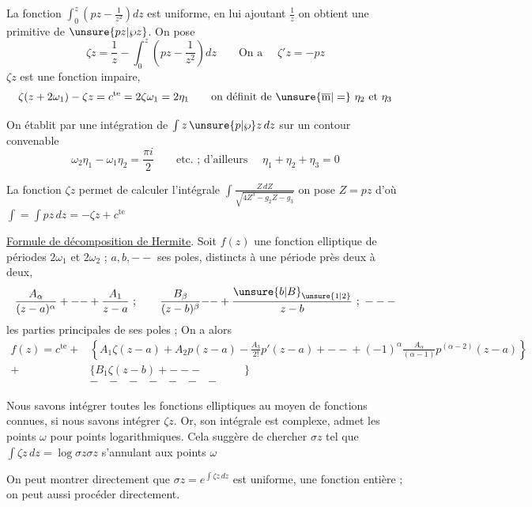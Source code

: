 La fonction $\int_0^z(pz-\frac1{z^2})dz$ est uniforme, en lui ajoutant $\frac1z$ on obtient une primitive de $\unsure{pz|\wp z}$. On pose
\[
\zeta z=\frac1z-\int_0^z(pz-\frac1{z^2})dz\qquad\text{On a }\quad\zeta'z=-pz
\]
$\zeta z$ est une fonction impaire,  
\[
\zeta(z+2\omega_1)-\zeta z=c^{\mathrm{te}}=2\zeta\omega_1=2\eta_1\qquad
\text{on définit de }\unsure{\overline{\mathrm m}|=}\ \eta_2\text{ et }\eta_3
\]

On établit par une intégration de $\int z\,\unsure{p|\wp}z\,dz$ sur un contour convenable
\[
\omega_2\eta_1-\omega_1\eta_2=\frac{\pi i}{2}\qquad\text{etc. ; d'ailleurs }\quad\eta_1+\eta_2+\eta_3=0
\]

La fonction $\zeta z$ permet de calculer l'intégrale $\displaystyle\int\frac{Z\,dZ}{\sqrt{4Z^3-g_2Z-g_3}}$ on pose $Z=pz$ d'où $\displaystyle\int=\int pz\,dz=-\zeta z+c^{\mathrm{te}}$


\uline{Formule de décomposition de Hermite}. Soit $f(z)$ une fonction elliptique de périodes $2\omega_1$ et $2\omega_2$ ; $a,b,\mathord{--}$ ses poles, distincts à une période près deux à deux,
\[
\frac{A_\alpha}{(z-a)^\alpha}+\mathord{--}+\frac{A_1}{z-a}\ ;\qquad
\frac{B_\beta}{(z-b)^\beta}\mathord{--}+\frac{\unsure{b|B}_{\unsure{1|2}}}{z-b}\ ;\ \mathord{---}
\]
les parties principales de ses poles ; On a alors
\[
\begin{aligned}
f(z)=c^{\mathrm{te}}+{}&\left\{A_1\zeta(z-a)+A_2p(z-a)-\frac{A_3}{2!}p'(z-a)+\mathord{--}+(-1)^\alpha\frac{A_\alpha}{(\alpha-1)}p^{(\alpha-2)}(z-a)\right\}\\
+{}&\{B_1\zeta(z-b)+\mathord{---}\qquad\qquad\}\\
&\mathord{-}\quad\mathord{-}\quad\mathord{-}\quad\mathord{-}\quad\mathord{-}\quad\mathord{-}\quad\mathord{-}
\end{aligned}
\]

 Nous savons intégrer toutes les fonctions elliptiques au moyen de fonctions connues, si nous savons intégrer $\zeta z$. Or, son intégrale est complexe,  admet  les points $\omega$ pour points logarithmiques. Cela suggère de chercher $\sigma z$ tel que $\int\zeta z\,dz=\log\sigma z$\qquad $\sigma z$ s'annulant aux points $\omega$\unsure{--}

On peut montrer directement que $\sigma z=e^{\int\zeta z\,dz}$ est uniforme,   une fonction entière ;  on peut aussi procéder directement.


